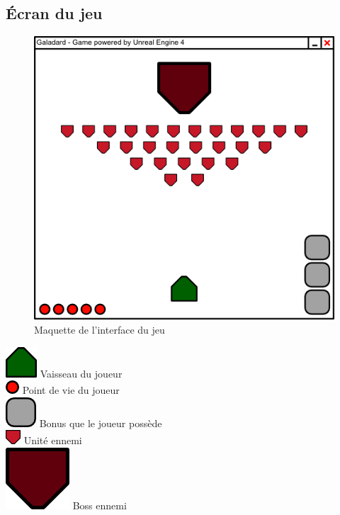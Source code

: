 \documentclass[11pt, a4paper, oneside]{article}
\begin{document}
\subsection{Écran du jeu}
\begin{figure}[h]
	\begin{center}
	\includegraphics[scale=0.2]{interface}
	\caption{Maquette de l'interface du jeu}
	\end{center}
\end{figure}
\includegraphics[scale=0.1]{joueur} Vaisseau du joueur\\[0.2cm]
\includegraphics[scale=0.2]{pointdevie} Point de vie du joueur\\[0.2cm]
\includegraphics[scale=0.1]{bonus} Bonus que le joueur possède\\[0.2cm]
\includegraphics[scale=0.2]{ennemi} Unité ennemi\\[0.2cm]
\includegraphics[scale=0.05]{boss} Boss ennemi
\newpage
\end{document}
